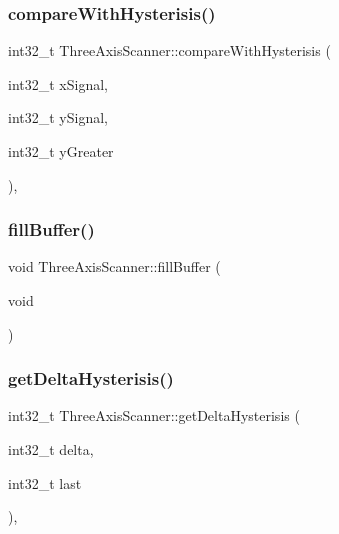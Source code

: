 \subsubsection{\texorpdfstring{compare\+With\+Hysterisis()}{compareWithHysterisis()}}
{\footnotesize\ttfamily int32\+\_\+t Three\+Axis\+Scanner\+::compare\+With\+Hysterisis (\begin{DoxyParamCaption}\item[{int32\+\_\+t}]{x\+Signal,  }\item[{int32\+\_\+t}]{y\+Signal,  }\item[{int32\+\_\+t}]{y\+Greater }\end{DoxyParamCaption})\hspace{0.3cm}{\ttfamily [inline]}, {\ttfamily [private]}}

\mbox{\label{class_three_axis_scanner_a4db94f0a424eeebb35b87e3ea74050dc}} 
\subsubsection{\texorpdfstring{fill\+Buffer()}{fillBuffer()}}
{\footnotesize\ttfamily void Three\+Axis\+Scanner\+::fill\+Buffer (\begin{DoxyParamCaption}\item[{void}]{ }\end{DoxyParamCaption})}

\mbox{\label{class_three_axis_scanner_a09735acf1f7906a7f4aad3165f3c454c}} 
\subsubsection{\texorpdfstring{get\+Delta\+Hysterisis()}{getDeltaHysterisis()}}
{\footnotesize\ttfamily int32\+\_\+t Three\+Axis\+Scanner\+::get\+Delta\+Hysterisis (\begin{DoxyParamCaption}\item[{int32\+\_\+t}]{delta,  }\item[{int32\+\_\+t}]{last }\end{DoxyParamCaption})\hspace{0.3cm}{\ttfamily [inline]}, {\ttfamily [private]}}

